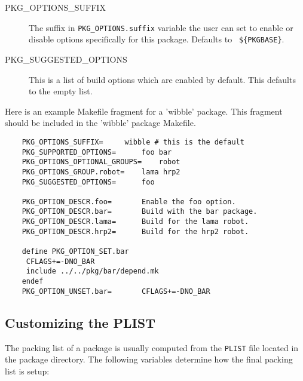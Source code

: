 \begin{description}
   \smallbreak
   \item[PKG\_OPTIONS\_SUFFIX]
   The suffix in {\tt PKG\_OPTIONS.suffix} variable the user can set to enable
   or disable options specifically for this package. Defaults to {\tt
   \$\{PKGBASE\}}.

   \smallbreak
   \item[PKG\_SUGGESTED\_OPTIONS]
   This is a list of build options which are enabled by default. This defaults
   to the empty list.

\end{description}

Here is an example Makefile fragment for a 'wibble' package. This fragment
should be included in the 'wibble' package Makefile.

\begin{verbatim}
	PKG_OPTIONS_SUFFIX=		wibble # this is the default
	PKG_SUPPORTED_OPTIONS=		foo bar
	PKG_OPTIONS_OPTIONAL_GROUPS=	robot
	PKG_OPTIONS_GROUP.robot=	lama hrp2
	PKG_SUGGESTED_OPTIONS=		foo

	PKG_OPTION_DESCR.foo=		Enable the foo option.
	PKG_OPTION_DESCR.bar=		Build with the bar package.
	PKG_OPTION_DESCR.lama=		Build for the lama robot.
	PKG_OPTION_DESCR.hrp2=		Build for the hrp2 robot.

	define PKG_OPTION_SET.bar
	 CFLAGS+=-DNO_BAR
	 include ../../pkg/bar/depend.mk
	endef
	PKG_OPTION_UNSET.bar=		CFLAGS+=-DNO_BAR
\end{verbatim}

\subsection{Customizing the PLIST} %
\label{section:genvars:PLIST}

The packing list of a package is usually computed from the {\tt PLIST} file
located in the package directory. The following variables determine how the
final packing list is setup:

